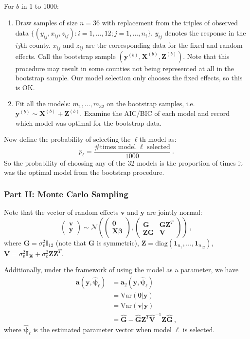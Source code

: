 \documentclass{article}
\begin{document}
For $b$ in 1 to 1000:
\begin{enumerate}
	\item Draw samples of size $n=36$ with replacement from the triples of observed data $\{(y_{ij},x_{ij},z_{ij}):i=1,...,12;j=1,...,n_i\}$. $y_{ij}$ denotes the response in the $ij$th county. $x_{ij}$ and $z_{ij}$ are the corresponding data for the fixed and random effects.  Call the bootstrap sample $(\mathbf y^{(b)},\mathbf X^{(b)},\mathbf Z^{(b)})$. Note that this procedure may result in some counties not being represented at all in the bootstrap sample. Our model selection only chooses the fixed effects, so this is OK.
	\item Fit all the models: $m_1,\dots,m_{32}$ on the bootstrap samples, i.e. $\mathbf y^{(b)} \sim \mathbf X^{(b)} + \mathbf Z^{(b)}$. Examine the AIC/BIC of each model and record which model was optimal for the bootstrap data.
\end{enumerate}
Now define the probability of selecting the $\ell$th model as:
\[
p_\ell = \frac{\# \text{times model } \ell \text{ selected}}{1000}\ .
\]
So the probability of choosing any of the 32 models is the proportion of times it was the optimal model from the bootstrap procedure.

\subsubsection{Part II: Monte Carlo Sampling}

Note that the vector of random effects $\mathbf v$ and $\mathbf y$ are jointly normal:
\[
\begin{pmatrix}\mathbf v \\ \mathbf y \end{pmatrix} \sim \mathcal N \left(\begin{pmatrix}\mathbf 0 \\ \mathbf X\boldsymbol\beta \end{pmatrix}, \begin{pmatrix}\mathbf G & \mathbf G\mathbf Z^T \\ \mathbf Z\mathbf G & \mathbf V \end{pmatrix}\right)\ ,
\]
where $\mathbf G=\sigma_v^2 \mathbf I_{12}$ (note that $\mathbf G$ is symmetric), $\mathbf Z=\text{diag}(\boldsymbol{1}_{n_1},...,\boldsymbol{1}_{n_{12}})$, $\mathbf V=\sigma_v^2 \mathbf I_{36} + \sigma_e^2 \mathbf Z\mathbf Z^T$.
\medbreak

Additionally, under the framework of using the model as a parameter, we have
\begin{align*}
\mathbf a(\mathbf y,\hat{\boldsymbol\psi}_\ell) &= \mathbf a_2(\mathbf y,\hat{\boldsymbol\psi}_\ell) \\
&= \text{Var}(\boldsymbol\theta|\mathbf y) \\
&= \text{Var}(\mathbf v|\mathbf y) \\
&= \hat{\mathbf G}-\hat{\mathbf G}\mathbf Z^T \hat{\mathbf V}^{-1} \mathbf Z \hat{\mathbf G}\ ,
\end{align*}
where $\hat{\boldsymbol\psi}_\ell$ is the estimated parameter vector when model $\ell$ is selected.
\medbreak
\end{document}

